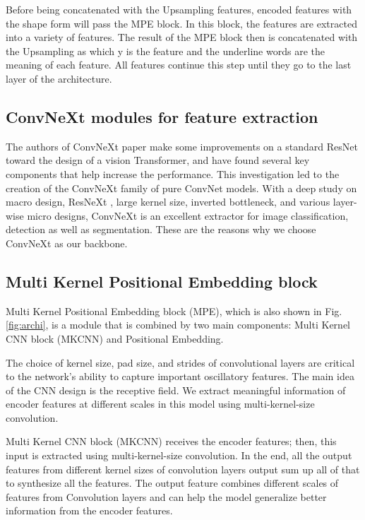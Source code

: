 \documentclass[conference]{IEEEtran}
\begin{document}
Before being concatenated with the Upsampling features, encoded features with the shape form  will pass the MPE block. In this block, the features are extracted into a variety of features. The result of the MPE block then is concatenated with the Upsampling as  which y is the feature and the underline words are the meaning of each feature. All features continue this step until they go to the last layer of the architecture.

\subsection{ConvNeXt modules for feature extraction}
The authors of ConvNeXt paper \cite{convnet} make some improvements on a standard ResNet \cite{resnet} toward the design of a vision Transformer, and have found several key components that help increase the
performance. This investigation led to the creation of the ConvNeXt family of pure ConvNet models. With a deep
study on macro design, ResNeXt \cite{resnext}, large kernel size, inverted bottleneck, and various layer-wise micro designs, ConvNeXt is an excellent extractor for image classification, detection as well as segmentation. These are the reasons why we choose ConvNeXt as our backbone.

\subsection{Multi Kernel Positional Embedding block}
Multi Kernel Positional Embedding block (MPE), which is also shown in Fig. \ref{fig:archi}, is a module that is combined by two main components: Multi Kernel CNN block (MKCNN) and Positional Embedding.

\vspace{1mm}

The choice of kernel size, pad size, and strides of convolutional layers are critical to the network's ability to capture important oscillatory features. The main idea of the CNN design is the receptive field. We extract meaningful information of encoder features at different scales in this model using multi-kernel-size convolution.

\vspace{1mm}

Multi Kernel CNN block (MKCNN) receives the encoder features; then, this input is extracted using multi-kernel-size convolution. In the end, all the output features from different kernel sizes of convolution layers output sum up all of that to synthesize all the features. The output feature combines different scales of features from Convolution layers and can help the model generalize better information from the encoder features.
\end{document}
